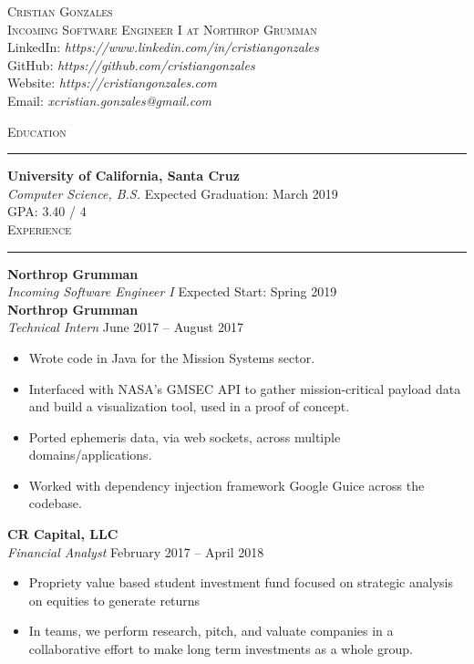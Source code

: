 \documentclass{res}
\begin{document}
\begin{resume}

\begin{center}
\textsc{{\Huge Cristian Gonzales}}\\
\vspace{1mm}
\textsc{\large Incoming Software Engineer I at Northrop Grumman}\\
\vspace{1mm}
LinkedIn: \textit{https://www.linkedin.com/in/cristiangonzales}\\
GitHub: \textit{https://github.com/cristiangonzales}\\
Website: \textit{https://cristiangonzales.com}\\
Email: \textit{xcristian.gonzales@gmail.com}\\
\end{center}


\textsc{{\Large Education}}
\vspace{0.5mm}
\hrule width18.5cm
\textbf{University of California, Santa Cruz}\\
\textit{Computer Science, B.S.}
\hfill
Expected Graduation: March 2019\\
GPA: 3.40 / 4\\

\textsc{{\Large Experience}}
\vspace{0.5mm}
\hrule width18.5cm
\textbf{Northrop Grumman}\\
\textit{Incoming Software Engineer I}
\hfill
Expected Start: Spring 2019\\[2mm]
\textbf{Northrop Grumman}\\
\textit{Technical Intern}
\hfill
June 2017 -- August 2017\\[1mm]
	\begin{itemize}
		\vspace{-3mm}
		\item Wrote code in Java for the Mission Systems sector.
		\item Interfaced with NASA's GMSEC API to gather mission-critical payload data and build a visualization tool, used in a proof of concept.
		\item Ported ephemeris data, via web sockets, across multiple domains/applications.
		\item Worked with dependency injection framework Google Guice across the codebase.
	\end{itemize}
\textbf{CR Capital, LLC}\\
\textit{Financial Analyst}
\hfill
February 2017 -- April 2018\\
	\begin{itemize}
		\vspace{-3mm}
		\item Propriety value based student investment fund focused on strategic analysis on equities to generate returns
		\item In teams, we perform research, pitch, and valuate companies in a collaborative effort to make long term investments as a whole group.
	\end{itemize}
	\vspace{0.5mm}


\end{resume}
\end{document}
